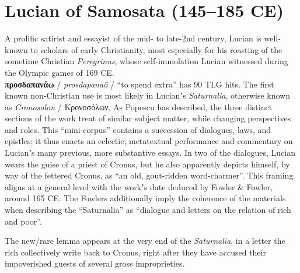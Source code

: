 %
%
\chapter{Lucian of Samosata (145--185 CE)}%
\justifying%
\vspace*{3mm}%
%
\noindent{}A prolific satirist and essayist of the mid- to late-2nd century, %
Lucian is well-known to scholars of early Christianity, %
most especially for his roasting of the sometime Christian \textit{Peregrinus}, %
whose self-immolation Lucian witnessed during the Olympic games of 169 CE. \\[2mm] %

\noindent{}\textbf{προσδαπανάω} / \textit{prosdapanaō} / “to spend extra” %
has 90 TLG hits. %
The first known non-Christian use is most likely in Lucianʼs \textit{Saturnalia}, %
otherwise known as \textit{Cronosolon} / Κρονοσόλων. %
As Popescu has described, the three distinct sections of the work treat of similar subject matter, %
while changing perspectives and roles. %
This “mini-corpus” contains a succession of dialogues, laws, and epistles; %
it thus enacts an eclectic, metatextual performance and commentary %
on Lucianʼs many previous, more substantive essays. %
In two of the dialogues, Lucian wears the guise of a priest of Cronus, %
but he also apparently depicts himself, by way of the fettered Cronus, %
as “an old, gout-ridden word-charmer”. %
This framing aligns at a general level with the workʼs date %
deduced by Fowler \& Fowler, around 165 CE. 
The Fowlers additionally imply the coherence of the materials when %
describing the “Saturnalia” as “dialogue and letters on the relation of rich and poor”. %

The new/rare lemma appears at the very end of the \textit{Saturnalia}, %
in a letter the rich collectively write back to Cronus, %
right after they have accused their impoverished guests of several gross improprieties. \clearpage

